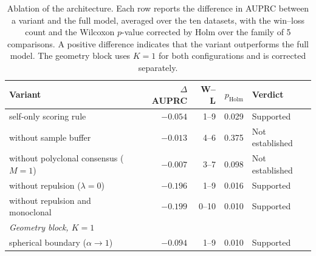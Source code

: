 
\begin{table}[!htbp]
\centering
\caption{Ablation of the architecture. Each row reports the difference in AUPRC between a variant and the full model, averaged over the ten datasets, with the win--loss count and the Wilcoxon $p$-value corrected by Holm over the family of 5 comparisons. A positive difference indicates that the variant outperforms the full model. The geometry block uses $K=1$ for both configurations and is corrected separately.}
\label{tab:ablation}
\small
\begin{tabular}{lrrrl}
\toprule
\textbf{Variant} & \textbf{$\Delta$ AUPRC} & \textbf{W--L} & \textbf{$p_{\text{Holm}}$} & \textbf{Verdict} \\
\midrule
self-only scoring rule & $-0.054$ & 1--9 & 0.029 & Supported \\
without sample buffer & $-0.013$ & 4--6 & 0.375 & Not established \\
without polyclonal consensus ($M=1$) & $-0.007$ & 3--7 & 0.098 & Not established \\
without repulsion ($\lambda{=}0$) & $-0.196$ & 1--9 & 0.016 & Supported \\
without repulsion and monoclonal & $-0.199$ & 0--10 & 0.010 & Supported \\
\midrule
\multicolumn{5}{l}{\textit{Geometry block, $K=1$}} \\
\midrule
spherical boundary ($\alpha\to1$) & $-0.094$ & 1--9 & 0.010 & Supported \\
\bottomrule
\end{tabular}
\end{table}
